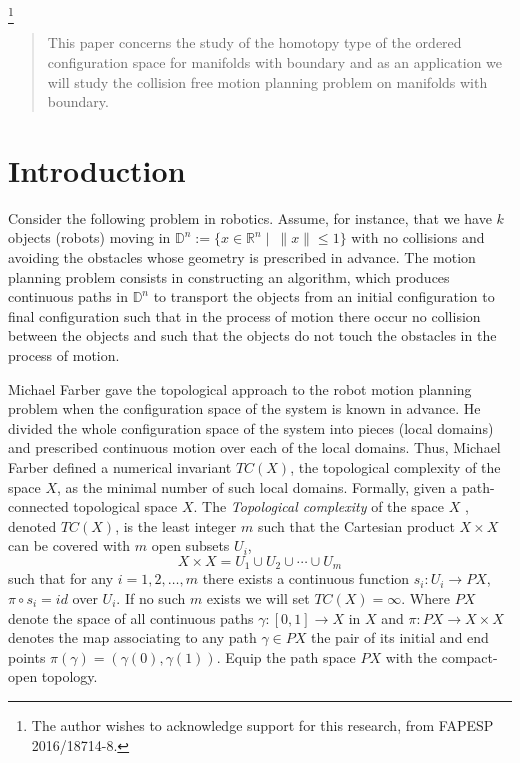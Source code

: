 \documentclass{amsart}
\theoremstyle{definition}
\numberwithin{equation}{section}
\begin{document}
\thanks {The author wishes to acknowledge support for this research, from FAPESP 2016/18714-8.}


\begin{abstract}

This paper concerns the study of the homotopy type of the ordered configuration space for manifolds with boundary and as an application we will study the collision free motion planning problem on manifolds with boundary.
   
\end{abstract}

\maketitle

\section{\bf Introduction}
Consider the following problem in robotics. Assume, for instance, that we have $k$ objects (robots) moving in $\mathbb{D}^n:=\{x\in \mathbb{R}^n\mid ~\|x\|\leq 1\}$ with no collisions and avoiding the obstacles whose geometry is prescribed in advance. The motion planning problem consists in constructing an algorithm, which produces continuous paths in $\mathbb{D}^n$ to transport the objects from an initial configuration to final configuration such that in the process of motion there occur no collision between the objects and such that the objects do not touch the obstacles in the process of motion.

Michael Farber \cite{farber2003topological} gave the topological approach to the robot motion planning problem when the configuration space of the system is known in advance. He divided the whole configuration space of the system into pieces (local domains) and prescribed continuous motion over each of the local domains. Thus, Michael Farber defined a numerical invariant $TC(X)$, the topological complexity of the space $X$, as the minimal number of such local domains. Formally,  given a path-connected topological space $X$. The \textit{Topological complexity} of the space $X$ \cite{farber2003topological}, denoted $TC(X)$, is the least integer $m$ such that the Cartesian product $X\times X$ can be covered with $m$ open subsets $U_i$, \begin{equation*}
        X \times X = U_1 \cup U_2 \cup\cdots \cup U_m 
    \end{equation*} such that for any $i = 1, 2, \ldots , m$ there exists a continuous function $s_i : U_i \longrightarrow PX$, $\pi\circ s_i = id$ over $U_i$. If no such $m$ exists we will set $TC(X)=\infty$. Where $PX$ denote the space of all continuous paths $\gamma: [0,1] \longrightarrow X$ in $X$ and  $\pi: PX \longrightarrow X \times X$ denotes the
map associating to any path $\gamma\in PX$ the pair of its initial and end points $\pi(\gamma)=(\gamma(0),\gamma(1))$. Equip the path space $PX$ with the compact-open topology. 
\end{document}
